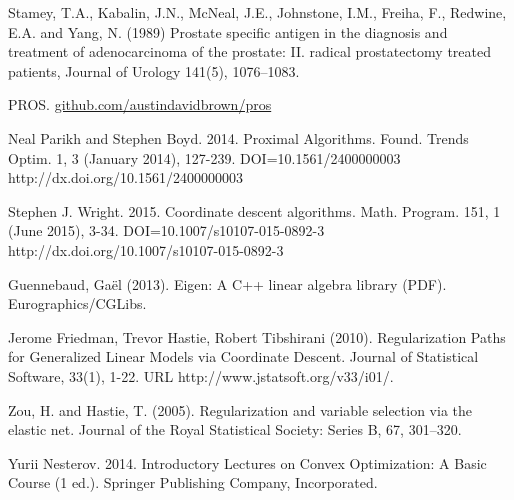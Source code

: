 \documentclass[10pt, reqno]{article}
\numberwithin{equation}{section}
\begin{document}
%
%
\newpage
\small
\begin{thebibliography}{1}

Stamey, T.A., Kabalin, J.N., McNeal, J.E., Johnstone, I.M., Freiha, F., Redwine, E.A. and Yang, N. (1989)
Prostate specific antigen in the diagnosis and treatment of adenocarcinoma of the prostate: II. radical prostatectomy treated patients, Journal of Urology 141(5), 1076–1083.

PROS. \href{https://github.com/austindavidbrown/pros}{github.com/austindavidbrown/pros}

Neal Parikh and Stephen Boyd. 2014. Proximal Algorithms. Found. Trends Optim. 1, 3 (January 2014), 127-239. DOI=10.1561/2400000003 http://dx.doi.org/10.1561/2400000003

Stephen J. Wright. 2015. Coordinate descent algorithms. Math. Program. 151, 1 (June 2015), 3-34. DOI=10.1007/s10107-015-0892-3 http://dx.doi.org/10.1007/s10107-015-0892-3

Guennebaud, Gaël (2013). Eigen: A C++ linear algebra library (PDF). Eurographics/CGLibs.

Jerome Friedman, Trevor Hastie, Robert Tibshirani (2010). Regularization Paths for Generalized Linear Models via Coordinate Descent. Journal of Statistical Software, 33(1), 1-22. URL http://www.jstatsoft.org/v33/i01/.

Zou, H. and Hastie, T. (2005). Regularization and variable selection via the elastic net. Journal of the Royal Statistical Society: Series B, 67, 301–320.

Yurii Nesterov. 2014. Introductory Lectures on Convex Optimization: A Basic Course (1 ed.). Springer Publishing Company, Incorporated.

\end{thebibliography}
\end{document}
